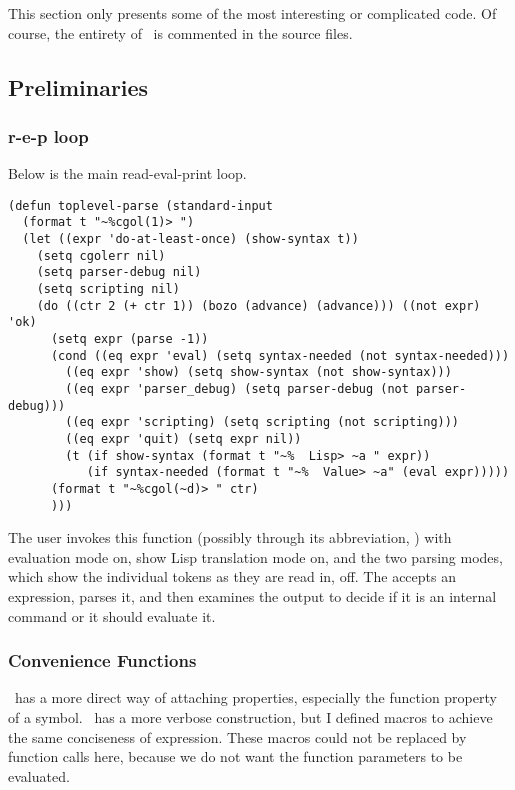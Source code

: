 This section only presents some of the most interesting or complicated
code.  Of course, the entirety of \cgol\ is  commented  in the source files.

\subsection {Preliminaries}

\subsubsection{r-e-p loop}

Below is the main read-eval-print loop.

{\footnotesize\begin{verbatim}
(defun toplevel-parse (standard-input
  (format t "~%cgol(1)> ")
  (let ((expr 'do-at-least-once) (show-syntax t))
    (setq cgolerr nil)
    (setq parser-debug nil)
    (setq scripting nil)
    (do ((ctr 2 (+ ctr 1)) (bozo (advance) (advance))) ((not expr) 'ok)
      (setq expr (parse -1))
      (cond ((eq expr 'eval) (setq syntax-needed (not syntax-needed)))
	    ((eq expr 'show) (setq show-syntax (not show-syntax)))
	    ((eq expr 'parser_debug) (setq parser-debug (not parser-debug)))
	    ((eq expr 'scripting) (setq scripting (not scripting)))
	    ((eq expr 'quit) (setq expr nil))
	    (t (if show-syntax (format t "~%  Lisp> ~a " expr))
	       (if syntax-needed (format t "~%  Value> ~a" (eval expr)))))
      (format t "~%cgol(~d)> " ctr)
      )))
\end{verbatim}}

The user invokes this function (possibly through its abbreviation,
) with evaluation mode on, show Lisp translation mode on, and
the two parsing modes, which show the individual tokens as they are read
in, off.  The  accepts an expression, parses it, and then examines
the output to decide if it is an internal command or it should evaluate it.

\subsubsection{Convenience Functions}

\ml\ has a more direct way of attaching properties, especially the function
property of a symbol.  \cl\ has a more verbose  construction,
but I defined macros to achieve the same conciseness of expression.  
These macros could not be replaced by function calls here, because we do
not want the function parameters to be evaluated.

